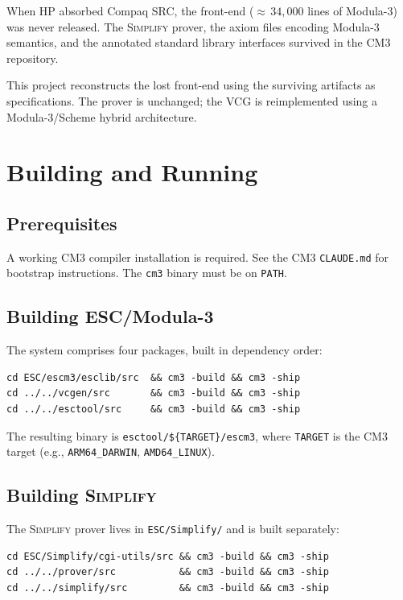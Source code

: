 \documentclass[11pt]{article}
\newcommand{\escm}{ESC/Modula-3}
\newcommand{\simplify}{\textsc{Simplify}}
\newcommand{\m}[1]{\texttt{#1}}
\begin{document}
When HP absorbed Compaq SRC, the front-end (${\approx}\,34{,}000$
lines of Modula-3) was never released.  The \simplify{} prover, the
axiom files encoding Modula-3 semantics, and the annotated standard
library interfaces survived in the CM3 repository.

This project reconstructs the lost front-end using the surviving
artifacts as specifications.  The prover is unchanged; the VCG is
reimplemented using a Modula-3/Scheme hybrid architecture.

\section{Building and Running}
\label{sec:build}

\subsection{Prerequisites}

A working CM3 compiler installation is required.  See the CM3
\m{CLAUDE.md} for bootstrap instructions.  The \m{cm3} binary
must be on \m{PATH}.

\subsection{Building \escm{}}

The system comprises four packages, built in dependency order:

\begin{lstlisting}[language={}]
cd ESC/escm3/esclib/src  && cm3 -build && cm3 -ship
cd ../../vcgen/src       && cm3 -build && cm3 -ship
cd ../../esctool/src     && cm3 -build && cm3 -ship
\end{lstlisting}

The resulting binary is
\m{esctool/\$\{TARGET\}/escm3}, where \m{TARGET} is the CM3 target
(e.g., \m{ARM64\_DARWIN}, \m{AMD64\_LINUX}).

\subsection{Building \simplify{}}

The \simplify{} prover lives in \m{ESC/Simplify/} and is built
separately:

\begin{lstlisting}[language={}]
cd ESC/Simplify/cgi-utils/src && cm3 -build && cm3 -ship
cd ../../prover/src           && cm3 -build && cm3 -ship
cd ../../simplify/src         && cm3 -build && cm3 -ship
\end{lstlisting}
\end{document}
